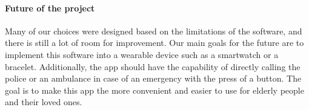 \documentclass[12pt,a4paper]{article}
\begin{document}
\paragraph{Future of the project}
    Many of our choices were designed based on the limitations of the software, and there is still a lot of room for improvement.
    Our main goals for the future are to implement this software into a wearable device such as a smartwatch or a bracelet.
    Additionally, the app should have the capability of directly calling the police or an ambulance in case of an emergency with the press of a button.
    The goal is to make this app the more convenient and easier to use for elderly people and their loved ones.  

\clearpage

\end{document}

